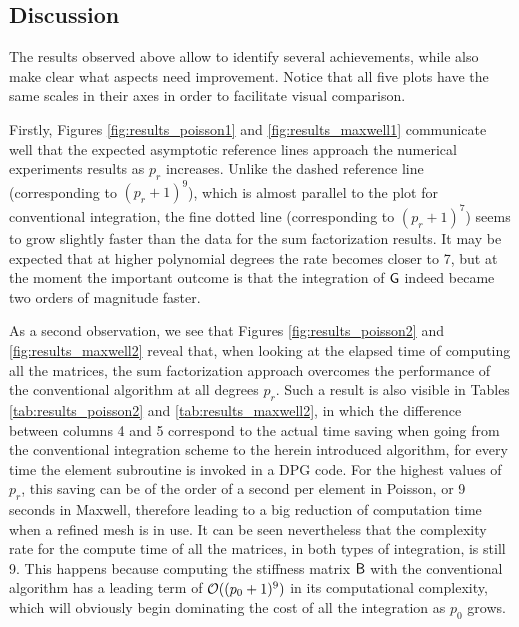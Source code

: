 \subsection{Discussion}

The results observed above allow to identify several achievements, while also make clear what aspects need improvement. Notice that all five plots have the same scales in their axes in order to facilitate visual comparison.

Firstly, Figures \ref{fig:results_poisson1} and \ref{fig:results_maxwell1} communicate well that the expected asymptotic reference lines approach the numerical experiments results as $p_r$ increases. Unlike the dashed reference line (corresponding to $(p_r+1)^9$), which is almost parallel to the plot for conventional integration, the fine dotted line (corresponding to $(p_r+1)^7$) seems to grow slightly faster than the data for the sum factorization results. It may be expected that at higher polynomial degrees the rate becomes closer to 7, but at the moment the important outcome is that the integration of $\mathsf{G}$ indeed became two orders of magnitude faster.


As a second observation, we see that Figures \ref{fig:results_poisson2} and \ref{fig:results_maxwell2} reveal that, when looking at the elapsed time of computing all the matrices, the sum factorization approach overcomes the performance of the conventional algorithm at all degrees $p_r$. Such a result is also visible in Tables \ref{tab:results_poisson2} and \ref{tab:results_maxwell2}, in which the difference between columns 4 and 5 correspond to the actual time saving when going from the conventional integration scheme to the herein introduced algorithm, for every time the element subroutine is invoked in a DPG code. For the highest values of $p_r$, this saving can be of the order of a second per element in Poisson, or 9 seconds in Maxwell, therefore leading to a big reduction of computation time when a refined mesh is in use. It can be seen nevertheless that the complexity rate for the compute time of all the matrices, in both types of integration, is still 9. This happens because computing the stiffness matrix $\mathsf{B}$ with the conventional algorithm has a leading term of $\mathcal{O}((p_0+1)^9)$ in its computational complexity, which will obviously begin dominating the cost of all the integration as $p_0$ grows.

